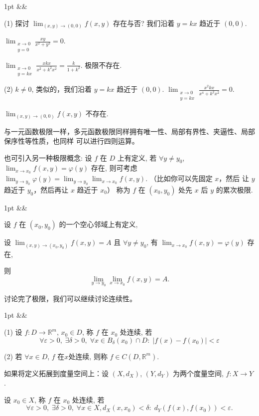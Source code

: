 \documentclass[a4paper]{article}
\newenvironment{formal}[1][]{%
\def\FrameCommand{%
\hspace{1pt}%
{\color{formalline}\vrule width 2pt}%
{\color{formalshade}\vrule width 4pt}%
\colorbox{formalshade}%
}%
\MakeFramed{\advance\hsize-\width\FrameRestore}%
\noindent
\hspace{-4.55pt}%
\begin{adjustwidth}{}{1pt}%
\setlength{\parindent}{0pt}%
\vspace{3pt}%
\ifx&#1&\else %
\textbf{#1}\par
\vspace{1pt}%
\fi }{%
\vspace{2pt}%
\end{adjustwidth}\endMakeFramed%
}
\newenvironment{solution}[1][]{%
\def\FrameCommand{%
\hspace{1pt}%
{\color{solutionline}\vrule width 2pt}%
{\color{solutionshade}\vrule width 4pt}%
\colorbox{solutionshade}%
}%
\MakeFramed{\advance\hsize-\width\FrameRestore}%
\noindent
\hspace{-4.55pt}%
\begin{adjustwidth}{}{1pt}%
\setlength{\parindent}{0pt}%
\vspace{3pt}%
\ifx&#1&\else %
\textbf{#1}\par
\vspace{1pt}%
\fi }{%
\vspace{2pt}%
\end{adjustwidth}\endMakeFramed%
}
\begin{document}
    \begin{solution}
        (1) 探讨 $\lim_{(x, y) \to (0, 0)}f(x, y)$ 存在与否? 我们沿着 $y = kx$
        趋近于 $(0, 0)$.

        $\lim_{\substack{x \to 0 \\ y = 0}}\frac{xy}{x^{2}+ y^{2}}= 0$.

        $\lim_{\substack{x \to 0 \\ y = kx}}\frac{xkx}{x^{2}+ k^{2}x^{2}}= \frac{k}{1
        + k^{2}}$. 极限不存在.

        (2) $k \neq 0$, 类似的，我们沿着 $y = kx$ 趋近于 $(0, 0)$. $\lim_{\substack{x \to 0 \\ y = kx}}
        \frac{x^{2}kx}{x^{4}+ k^{2}x^{2}}= 0$.

        $\lim_{(x, y) \to (0, 0)}f(x, y)$ 不存在.
    \end{solution}

    与一元函数极限一样，多元函数极限同样拥有唯一性、局部有界性、夹逼性、局部保序性等性质，也同样
    可以进行四则运算。

    也可引入另一种极限概念: 设 $f$ 在 $D$ 上有定义, 若 $\forall y \neq y_{0}$,
    $\lim_{x \to x_0}f(x, y) = \varphi(y)$ 存在, 则可考虑 $\lim_{y \to y_0}\varphi
    (y) = \lim_{y \to y_0}\lim_{x \to x_0}f(x, y )$. （比如你可以先固定 $x$，然后
    让 $y$ 趋近于 $y_{0}$，然后再让 $x$ 趋近于 $x_{0}$） 称为 $f$ 在 $(x_{0}, y_{0}
    )$ 处先 $x$ 后 $y$ 的累次极限.

    \begin{formal}
        [Prop] 设 $f$ 在 $(x_{0}, y_{0})$ 的一个空心邻域上有定义,

        设 $\lim_{(x, y) \to (x_0, y_0)}f(x, y) = A$ 且 $\forall y \neq y_{0}$,
        有 $\lim_{x \to x_0}f(x, y) = \varphi(y)$ 存在,

        则
        \[
            \lim_{y \to y_0}\lim_{x \to x_0}f(x, y) = A.
        \]
    \end{formal}

    讨论完了极限，我们可以继续讨论连续性。

    \begin{formal}
        [连续性] (1) 设 $f: D \to \mathbb{R}^{m}$, $x_{0}\in D$, 称 $f$ 在 $x_{0}$
        处连续, 若
        \[
            \forall \varepsilon > 0, \; \exists \delta > 0, \; \forall x \in B_{\delta}
            (x_{0}) \cap D: \; |f(x) - f(x_{0})| < \varepsilon
        \]

        (2) 若 $\forall x \in D$, $f$ 在$x$处连续, 则称 $f \in C(D, \mathbb{R}^{m}
        )$.

        \vspace{1em}

        如果将定义拓展到度量空间上：设 $(X, d_{X})$, $(Y, d_{Y})$ 为两个度量空间,
        $f: X \to Y$.

        设 $x_{0}\in X$, 称 $f$ 在 $x_{0}$ 处连续, 若
        \[
            \forall \varepsilon > 0, \; \exists \delta > 0, \; \forall x \in X, d
            _{X}(x, x_{0}) < \delta: \; d_{Y}(f(x), f(x_{0})) < \varepsilon.
        \]
    \end{formal}
\end{document}
